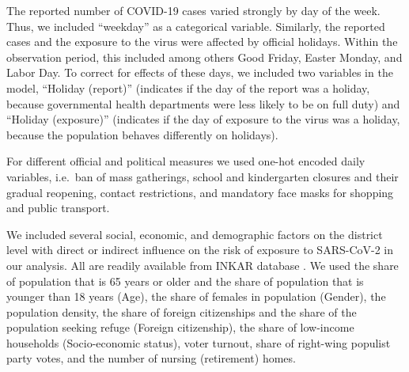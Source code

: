 \documentclass[]{elsarticle} %
\begin{document}
The reported number of COVID-19 cases varied strongly by day of the week. Thus, we included ``weekday'' as a categorical variable. Similarly, the reported cases and the exposure to the virus were affected by official holidays. Within the observation period, this included among others Good Friday, Easter Monday, and Labor Day. To correct for effects of these days, we included two variables in the model, ``Holiday (report)'' (indicates if the day of the report was a holiday, because governmental health departments were less likely to be on full duty) and ``Holiday (exposure)'' (indicates if the day of exposure to the virus was a holiday, because the population behaves differently on holidays).

For different official and political measures we used one-hot encoded daily variables, i.e.~ban of mass gatherings, school and kindergarten closures and their gradual reopening, contact restrictions, and mandatory face masks for shopping and public transport.

We included several social, economic, and demographic factors on the district level with direct or indirect influence on the risk of exposure to SARS-CoV-2 in our analysis. All are readily available from INKAR database \citep{inkar}. We used the share of population that is 65 years or older and the share of population that is younger than 18 years (Age), the share of females in population (Gender), the population density, the share of foreign citizenships and the share of the population seeking refuge (Foreign citizenship), the share of low-income households (Socio-economic status), voter turnout, share of right-wing populist party votes, and the number of nursing (retirement) homes.
\end{document}

